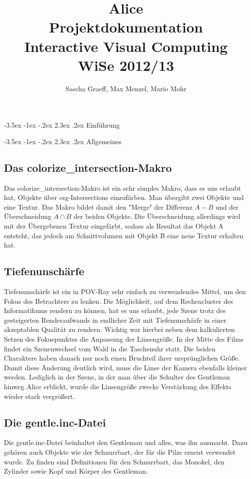\documentclass[twocolumn]{article}
\author{Sascha Graeff, Max Menzel, Mario Mohr}
\title{Alice \\ \small Projektdokumentation \\ Interactive Visual Computing \\ WiSe 2012/13}
\makeatletter
\renewcommand\section{\@startsection{section}{1}{\z@}%
                                      {-3.5ex \@plus -1ex \@minus -.2ex}%
                                      {2.3ex \@plus.2ex}%
                                      {\normalfont\large\bfseries}}
\makeatother
\begin{document}
\maketitle



\section{Einführung}

\section{Allgemeines}
\subsection{Das colorize\_intersection-Makro}
Das colorize\_intersection-Makro ist ein sehr simples Makro, dass es uns erlaubt hat, Objekte über csg-Intersections einzufärben.
Man übergibt zwei Objekte und eine Textur. Das Makro bildet damit den "Merge" der Differenz $A - B$ und der Überschneidung $A \cap B$ der beiden Objekte.
Die Überschneidung allerdings wird mit der Übergebenen Textur eingefärbt, sodass als Resultat das Objekt A entsteht, das jedoch am Schnittvolumen mit Objekt B eine neue Textur erhalten hat.

\subsection{Tiefenunschärfe}
Tiefenunschärfe ist ein in POV-Ray sehr einfach zu verwendendes Mittel, um den Fokus des Betrachters zu lenken.
Die Möglichkeit, auf dem Rechencluster des Informatikums rendern zu können, hat es uns erlaubt, jede Szene trotz des gesteigerten Renderaufwands in endlicher Zeit mit Tiefenunschärfe in einer akzeptablen Qualität zu rendern.
Wichtig war hierbei neben dem kalkulierten Setzen des Fokuspunktes die Anpassung der Linsengröße.
In der Mitte des Films findet ein Szenenwechsel vom Wald in die Taschenuhr statt.
Die beiden Charaktere haben danach nur noch einen Bruchteil ihrer ursprünglichen Größe. Damit diese Änderung deutlich wird, muss die Linse der Kamera ebenfalls kleiner werden.
Lediglich in der Szene, in der man über die Schulter des Gentleman hinweg Alice erblickt, wurde die Linsengröße zwecks Verstärkung des Effekts wieder stark vergrößert.

\subsection{Die gentle.inc-Datei} %
Die gentle.inc-Datei beinhaltet den Gentleman und alles, was ihn ausmacht. Dazu gehören auch Objekte wie der Schnurrbart, der für die Pilze erneut verwendet wurde.
Zu finden sind Definitionen für den Schnurrbart, das Monokel, den Zylinder sowie Kopf und Körper des Gentleman.
\end{document}
